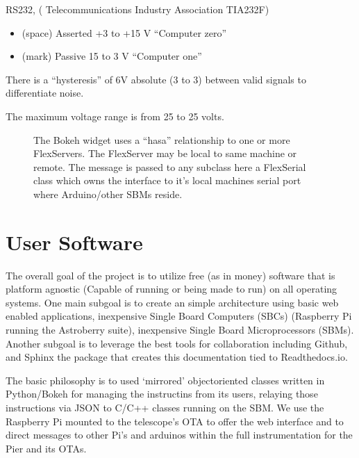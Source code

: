 \documentclass[letterpaper,10pt,english,openany,oneside]{sphinxmanual}
\begin{document}
\sphinxAtStartPar
RS232, ( Telecommunications Industry Association TIA\sphinxhyphen{}232\sphinxhyphen{}F)
\begin{itemize}
\item {} 
 (space)     Asserted        +3 to +15 V    “Computer zero”

\item {} 
 (mark)      Passive \sphinxhyphen{}15 to \sphinxhyphen{}3 V    “Computer one”

\end{itemize}

\sphinxAtStartPar
There is a “hysteresis” of 6V absolute (\sphinxhyphen{}3 to 3) between valid
signals to differentiate noise.

\sphinxAtStartPar
The maximum voltage range is from \sphinxhyphen{}25 to 25 volts.

\begin{figure}[htbp]
\centering
\capstart

\noindent{}
\caption{The Bokeh widget uses a “has\sphinxhyphen{}a” relationship to one or more FlexServers. The FlexServer may be local to same machine or remote.  The message is passed to any subclass \textendash{} here a FlexSerial class    which owns the interface to it’s local machines serial port where  Arduino/other SBMs reside.}\label{\detokenize{serial:id3}}\end{figure}


\chapter{User Software}
\label{\detokenize{software:user-software}}\label{\detokenize{software::doc}}
\sphinxAtStartPar
The overall goal of the project is to utilize free (as in money) software
that is platform agnostic (Capable of running or being made to run) on
all operating systems. One main sub\sphinxhyphen{}goal is to create an simple architecture
using basic web enabled applications, inexpensive Single Board Computers (SBCs)
(Raspberry Pi running the Astroberry suite), inexpensive Single Board
Microprocessors (SBMs). Another sub\sphinxhyphen{}goal is to leverage the best tools
for collaboration including Github, and Sphinx \textendash{} the package that
creates this documentation tied to Readthedocs.io.

\sphinxAtStartPar
The basic philosophy is to used ‘mirrored’ object\sphinxhyphen{}oriented classes written
in Python/Bokeh for managing the instructins from its users, relaying
those instructions via JSON to C/C++ classes running on the SBM. We use
the Raspberry Pi mounted to the telescope’s OTA to offer the web interface
and to direct messages to other Pi’s and arduinos within the full instrumentation
for the Pier and its OTAs.
\end{document}
